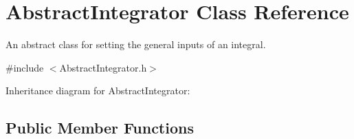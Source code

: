 \hypertarget{class_abstract_integrator}{}\section{Abstract\+Integrator Class Reference}
\label{class_abstract_integrator}


An abstract class for setting the general inputs of an integral.  




{\ttfamily \#include $<$Abstract\+Integrator.\+h$>$}



Inheritance diagram for Abstract\+Integrator\+:
\subsection*{Public Member Functions}
